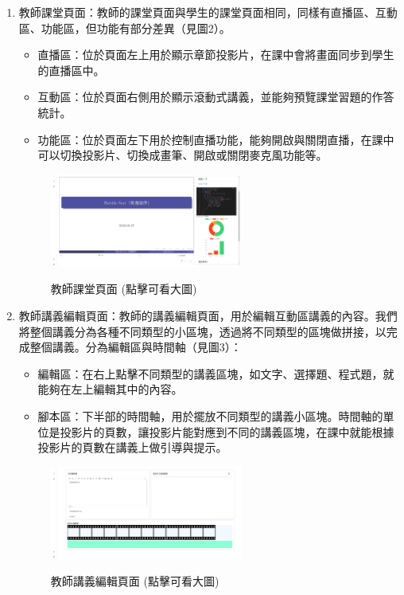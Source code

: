 \documentclass[12pt]{article}
\begin{document}
\begin{enumerate}[label=(\arabic*)]
  \item 教師課堂頁面：教師的課堂頁面與學生的課堂頁面相同，同樣有直播區、互動區、功能區，但功能有部分差異（見圖2）。
    \begin{itemize}
      \item 直播區：位於頁面左上用於顯示章節投影片，在課中會將畫面同步到學生的直播區中。
      \item 互動區：位於頁面右側用於顯示滾動式講義，並能夠預覽課堂習題的作答統計。
      \item 功能區：位於頁面左下用於控制直播功能，能夠開啟與關閉直播，在課中可以切換投影片、切換成畫筆、開啟或關閉麥克風功能等。
    \end{itemize}
  
    \begin{figure}[H]
      \centering
      \href{https://raw.githubusercontent.com/programingtw/proglearn-plan/main/2023全國大專校院智慧創新暨跨域整合創作競賽/img/teacher.png}{
        \includegraphics[width=0.60\textwidth]{./img/teacher.png}
      }
      \caption{教師課堂頁面 (點擊可看大圖)}
      \label{arc3}
    \end{figure}
  
  \item 教師講義編輯頁面：教師的講義編輯頁面，用於編輯互動區講義的內容。我們將整個講義分為各種不同類型的小區塊，透過將不同類型的區塊做拼接，以完成整個講義。分為編輯區與時間軸（見圖3）：
    \begin{itemize}
      \item 編輯區：在右上點擊不同類型的講義區塊，如文字、選擇題、程式題，就能夠在左上編輯其中的內容。
      \item 腳本區：下半部的時間軸，用於擺放不同類型的講義小區塊。時間軸的單位是投影片的頁數，讓投影片能對應到不同的講義區塊，在課中就能根據投影片的頁數在講義上做引導與提示。
    \end{itemize}

    \begin{figure}[H]
      \centering
      \href{https://raw.githubusercontent.com/programingtw/proglearn-plan/main/2023全國大專校院智慧創新暨跨域整合創作競賽/img/teacher2.png}{
        \includegraphics[width=0.60\textwidth]{./img/teacher2.png}
      }
      \caption{教師講義編輯頁面 (點擊可看大圖)}
      \label{arc4}
    \end{figure}

\end{enumerate}
\end{document}
